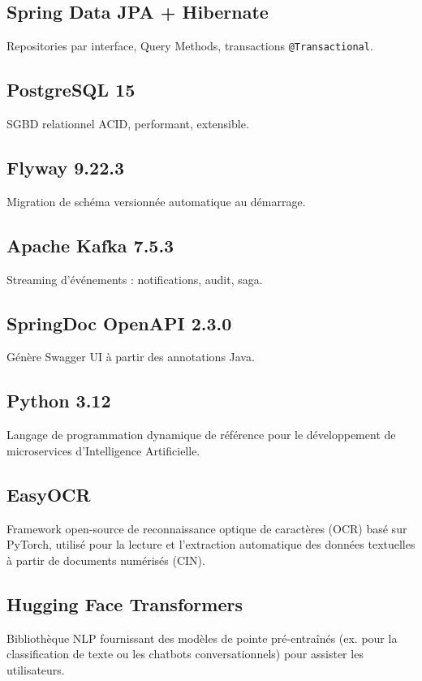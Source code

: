 \documentclass[12pt,a4paper,oneside]{report}
\begin{document}
\subsection{Spring Data JPA + Hibernate}
Repositories par interface, Query Methods, transactions \texttt{@Transactional}.

\subsection{PostgreSQL 15}
SGBD relationnel ACID, performant, extensible.

\subsection{Flyway 9.22.3}
Migration de schéma versionnée automatique au démarrage.

\subsection{Apache Kafka 7.5.3}
Streaming d'événements : notifications, audit, saga.

\subsection{SpringDoc OpenAPI 2.3.0}
Génère Swagger UI à partir des annotations Java.

\subsection{Python 3.12}
Langage de programmation dynamique de référence pour le développement de microservices d'Intelligence Artificielle.

\subsection{EasyOCR}
Framework open-source de reconnaissance optique de caractères (OCR) basé sur PyTorch, utilisé pour la lecture et l'extraction automatique des données textuelles à partir de documents numérisés (CIN).

\subsection{Hugging Face Transformers}
Bibliothèque NLP fournissant des modèles de pointe pré-entraînés (ex. pour la classification de texte ou les chatbots conversationnels) pour assister les utilisateurs.
\end{document}
